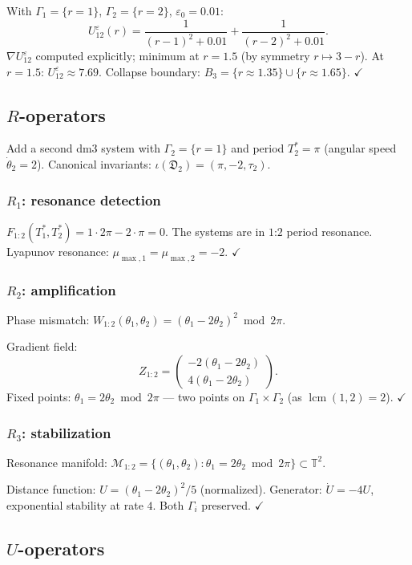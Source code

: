 \documentclass[12pt, oneside]{book}
\theoremstyle{plain}
\theoremstyle{definition}
\theoremstyle{remark}
\newcommand{\T}{\mathbb{T}}
\newcommand{\dm}{\mathfrak{D}}
\newcommand{\Orb}{\Gamma}
\newcommand{\cM}{\mathcal{M}}
\newcommand{\eps}{\varepsilon}
\DeclareMathOperator{\lcm}{lcm}
\begin{document}
With $\Orb_1=\{r=1\}$, $\Orb_2=\{r=2\}$, $\eps_0=0.01$:
\[
  U_{12}^\eps(r)
  = \frac{1}{(r-1)^2+0.01} + \frac{1}{(r-2)^2+0.01}.
\]
$\nabla U_{12}^\eps$ computed explicitly; minimum at $r=1.5$
(by symmetry $r\mapsto 3-r$). At $r=1.5$: $U_{12}^\eps\approx 7.69$.
Collapse boundary: $B_3=\{r\approx 1.35\}\cup\{r\approx 1.65\}$. $\checkmark$

\subsection{\texorpdfstring{$R$}{R}-operators}

Add a second dm3 system with $\Orb_2=\{r=1\}$ and period $T_2^*=\pi$
(angular speed $\dot\theta_2=2$). Canonical invariants:
$\iota(\dm_2)=(\pi,-2,\tau_2)$.

\subsubsection{$R_1$: resonance detection}

$F_{1:2}(T_1^*,T_2^*)=1\cdot 2\pi-2\cdot\pi=0$.
The systems are in $1$:$2$ period resonance.
Lyapunov resonance: $\mu_{\max,1}=\mu_{\max,2}=-2$. $\checkmark$

\subsubsection{$R_2$: amplification}

Phase mismatch: $W_{1:2}(\theta_1,\theta_2)=(\theta_1-2\theta_2)^2
\bmod 2\pi$.

Gradient field:
\[
  Z_{1:2} = \begin{pmatrix}-2(\theta_1-2\theta_2)\\
  4(\theta_1-2\theta_2)\end{pmatrix}.
\]
Fixed points: $\theta_1=2\theta_2\bmod 2\pi$ --- two points on
$\Orb_1\times\Orb_2$ (as $\lcm(1,2)=2$). $\checkmark$

\subsubsection{$R_3$: stabilization}

Resonance manifold:
$\cM_{1:2}=\{(\theta_1,\theta_2):\theta_1=2\theta_2\bmod 2\pi\}
\subset\T^2$.

Distance function: $U=(\theta_1-2\theta_2)^2/5$ (normalized).
Generator: $\dot U=-4U$, exponential stability at rate $4$.
Both $\Orb_i$ preserved. $\checkmark$

\subsection{\texorpdfstring{$U$}{U}-operators}
\end{document}
